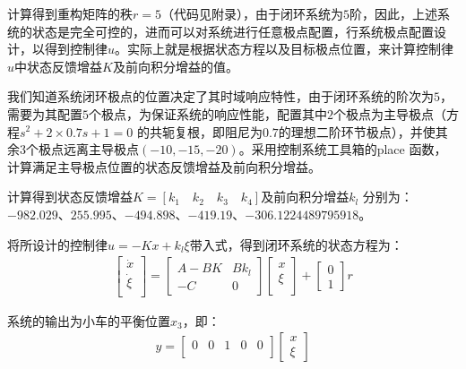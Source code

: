 \documentclass{ctexart}
\begin{document}
			计算得到重构矩阵的秩$r=5$（代码见附录），由于闭环系统为$5$阶，因此，上述系统的状态是完全可控的，进而可以对系统进行任意极点配置，行系统极点配置设计，以得到控制律$u$。实际上就是根据状态方程以及目标极点位置，来计算控制律$u$中状态反馈增益$K$及前向积分增益的值。\par
			我们知道系统闭环极点的位置决定了其时域响应特性，由于闭环系统的阶次为$5$，需要为其配置$5$个极点，为保证系统的响应性能，配置其中$2$个极点为主导极点（方程$s^2+2\times0.7s+1=0$ 的共轭复根，即阻尼为$0.7$的理想二阶环节极点），并使其余$3$个极点远离主导极点$(-10,-15,-20)$。采用控制系统工具箱的place 函数，计算满足主导极点位置的状态反馈增益及前向积分增益。\par
			计算得到状态反馈增益$K=[k_1 \quad k_2 \quad k_3 \quad k_4]$及前向积分增益$k_l$ 分别为：$-982.029$、$255.995$、$-494.898$、$-419.19$、$-306.1224489795918$。\par
			将所设计的控制律$u=-Kx+k_l\xi$带入式，得到闭环系统的状态方程为：
			\begin{gather}
				\begin{bmatrix}
					\dot{x}\\
					\dot{\xi}\\
				\end{bmatrix}
				=
				\begin{bmatrix}
					A-BK&Bk_l\\
					-C&0
				\end{bmatrix}
				\begin{bmatrix}
					x\\
					\xi\\
				\end{bmatrix}
				+
				\begin{bmatrix}
					0\\
					1
				\end{bmatrix}
				r
			\end{gather}\par
			系统的输出为小车的平衡位置$x_3$，即：
			\begin{gather}
				y=
				\begin{bmatrix}
					0&0&1&0&0\\
				\end{bmatrix}
				\begin{bmatrix}
					x\\
					\xi
				\end{bmatrix}
			\end{gather}\par
\end{document}
